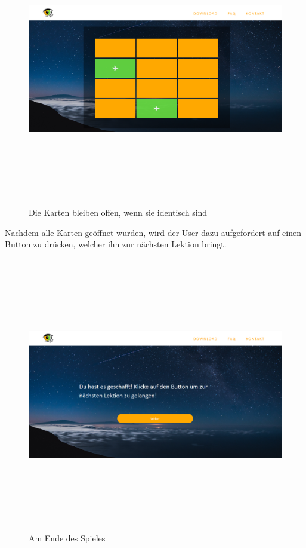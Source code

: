 \begin{figure} [h]
	\centering
\includegraphics[width=12cm,height=12cm,keepaspectratio]{webseite_memory_1} 
	\caption{Die Karten bleiben offen, wenn sie identisch sind}
\end{figure}
Nachdem alle Karten geöffnet wurden, wird der User dazu aufgefordert auf einen Button zu drücken, welcher ihn zur nächsten Lektion bringt. 
\begin{figure} [h]
	\centering
\includegraphics[width=12cm,height=12cm,keepaspectratio]{webseite_memory_2} 
	\caption{Am Ende des Spieles}
\end{figure}
